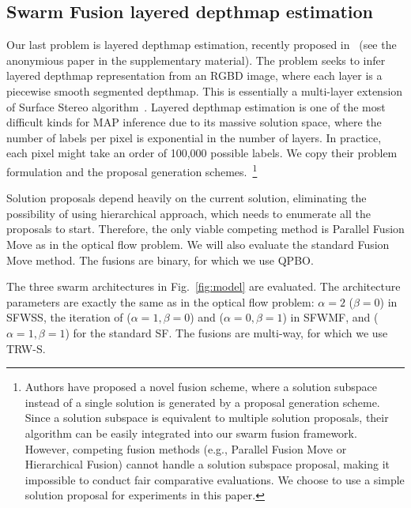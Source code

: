 \subsection{Swarm Fusion layered depthmap estimation}
Our last problem is layered depthmap estimation, recently proposed
in~\cite{layered_depthmap} (see the anonymious paper in the
supplementary material).  The problem seeks to infer layered depthmap
representation from an RGBD image, where each layer is a piecewise
smooth segmented depthmap. This is essentially a multi-layer extension
of Surface Stereo algorithm~\cite{surface_stereo}.
%
Layered depthmap estimation is one of the most difficult kinds for MAP
inference due to its massive solution space, where the number of labels
per pixel is exponential in the number of layers. In practice, each
pixel might take an order of 100,000 
possible labels. We copy their problem formulation and the proposal
generation schemes.~\footnote{Authors have proposed a novel fusion scheme,
where a solution subspace instead of a single solution is generated by a
proposal generation scheme. Since a solution subspace is equivalent to
multiple solution proposals, their algorithm can be easily integrated
into our swarm fusion framework.  However, competing fusion methods
(e.g., Parallel Fusion Move or Hierarchical Fusion) cannot handle a
solution subspace proposal, making it impossible to conduct fair
comparative evaluations. We choose to use a simple solution proposal for
experiments in this paper.}


Solution proposals depend heavily on the current solution, eliminating
the possibility of using hierarchical approach, which needs to enumerate
all the proposals to start. Therefore, the only viable competing method
is Parallel Fusion Move as in the optical flow problem. We will also
evaluate the standard Fusion Move method.
%
The fusions are binary, for which we use QPBO.



The three swarm architectures in Fig.~\ref{fig:model} are evaluated.
The architecture parameters are exactly the same as in the optical flow problem:
$\alpha=2$ ($\beta=0$) in SFWSS, the iteration of
($\alpha=1, \beta=0$) and ($\alpha=0, \beta=1$) in SFWMF, and
($\alpha=1, \beta=1$) for the standard SF.
%
The fusions are multi-way, for which we use TRW-S.
